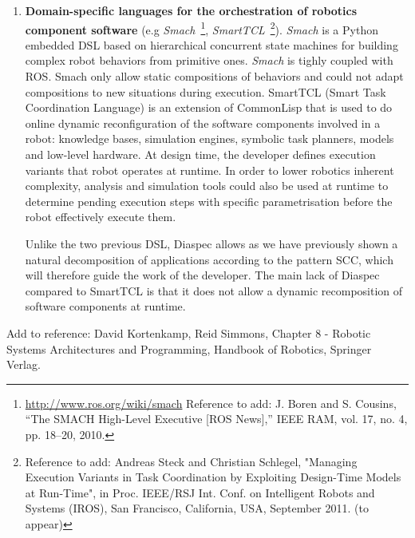 \begin{enumerate}
\item {\bf Domain-specific languages for the orchestration of robotics component software} (e.g \emph{Smach}~\footnote{\url{http://www.ros.org/wiki/smach} Reference to add: J. Boren and S. Cousins, “The SMACH High-Level Executive [ROS News],” IEEE RAM, vol. 17, no. 4, pp. 18–20, 2010. }, \emph{SmartTCL}~\footnote{Reference to add: Andreas Steck and Christian Schlegel, "Managing Execution Variants in Task Coordination by Exploiting Design-Time Models at Run-Time", in Proc. IEEE/RSJ Int. Conf. on Intelligent Robots and Systems (IROS), San Francisco, California, USA, September 2011. (to appear)}). \emph{Smach} is a Python embedded DSL based on hierarchical concurrent state machines for building complex robot behaviors from primitive ones. \emph{Smach} is tighly coupled with ROS. Smach only allow static compositions of behaviors and could not adapt compositions to new situations during execution.
SmartTCL (Smart Task Coordination Language) is an extension of CommonLisp that is used to do online dynamic reconfiguration of the software components involved in a robot: knowledge bases, simulation engines, symbolic task planners, models and low-level hardware. At design time, the developer defines execution variants that robot operates at runtime. In order to lower robotics inherent complexity, analysis and simulation tools could also be used at runtime to determine pending execution steps with specific parametrisation before the robot effectively execute them.

Unlike the two previous DSL, Diaspec allows as we have previously shown a natural decomposition of applications according to the pattern SCC, which will therefore guide the work of the developer. The main lack of Diaspec compared to SmartTCL is that it does not allow a dynamic recomposition of software components at runtime.

\end{enumerate}
Add to reference: David Kortenkamp, Reid Simmons, Chapter 8 - Robotic Systems Architectures and Programming, Handbook of Robotics, Springer Verlag.
